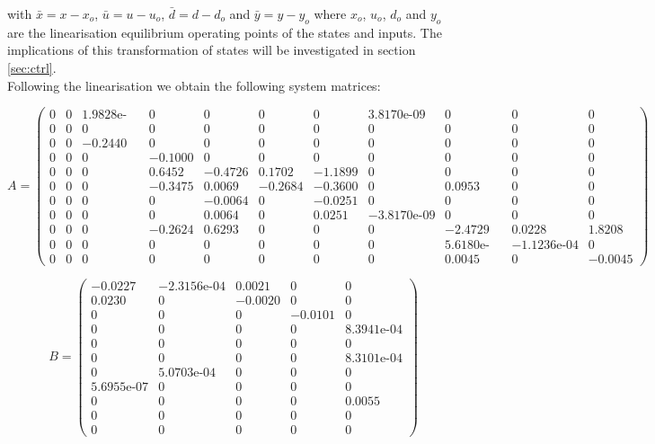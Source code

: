 with $\bar{x} = x-x_o$, $\bar{u} = u-u_o$, $\bar{d} = d-d_o$ and $\bar{y} = y-y_o$ where $x_o$, $u_o$, $d_o$ and $y_o$ are the linearisation equilibrium operating points of the states and inputs. The implications of this transformation of states will be investigated in section \cref{sec:ctrl}.\\

Following the linearisation we obtain the following system matrices:

\begin{equation}  \label{eq:A_full}
	A =
	\left(\begin{array}{ccccccccccc}
		0 & 0 & \text{1.9828e-04} & 0 & 0 & 0 & 0 & \text{3.8170e-09} & 0 & 0 & 0\\
		0 & 0 & 0 & 0 & 0 & 0 & 0 & 0 & 0 & 0 & 0\\
		0 & 0 & -0.2440 & 0 & 0 & 0 & 0 & 0 & 0 & 0 & 0\\
		0 & 0 & 0 & -0.1000 & 0 & 0 & 0 & 0 & 0 & 0 & 0\\
		0 & 0 & 0 & 0.6452 & -0.4726 & 0.1702 & -1.1899 & 0 & 0 & 0 & 0\\
		0 & 0 & 0 & -0.3475 & 0.0069 & -0.2684 & -0.3600 & 0 & 0.0953 & 0 & 0\\
		0 & 0 & 0 & 0 & -0.0064 & 0 & -0.0251 & 0 & 0 & 0 & 0\\
		0 & 0 & 0 & 0 & 0.0064 & 0 & 0.0251 & -\text{3.8170e-09} & 0 & 0 & 0\\
		0 & 0 & 0 & -0.2624 & 0.6293 & 0 & 0 & 0 & -2.4729 & 0.0228 & 1.8208\\
		0 & 0 & 0 & 0 & 0 & 0 & 0 & 0 & \text{5.6180e-05} & -\text{1.1236e-04} & 0\\
		0 & 0 & 0 & 0 & 0 & 0 & 0 & 0 & 0.0045 & 0 & -0.0045
	\end{array}\right)
\end{equation}

\begin{equation}  \label{eq:B_full}
	B = \left(\begin{array}{ccccc}
		-0.0227 & -\text{2.3156e-04} & 0.0021 & 0 & 0\\
		0.0230 & 0 & -0.0020 & 0 & 0\\
		0 & 0 & 0 & -0.0101 & 0\\
		0 & 0 & 0 & 0 & \text{8.3941e-04}\\
		0 & 0 & 0 & 0 & 0\\
		0 & 0 & 0 & 0 & \text{8.3101e-04}\\
		0 & \text{5.0703e-04} & 0 & 0 & 0\\
		\text{5.6955e-07} & 0 & 0 & 0 & 0\\
		0 & 0 & 0 & 0 & 0.0055\\
		0 & 0 & 0 & 0 & 0\\
		0 & 0 & 0 & 0 & 0
	\end{array}\right)
\end{equation}

